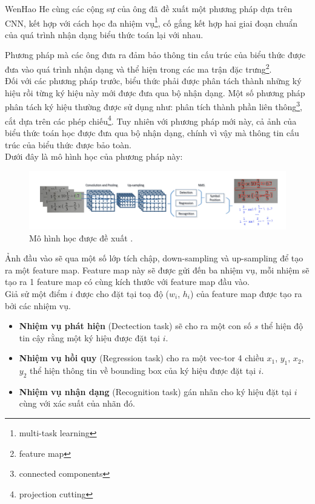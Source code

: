 \documentclass[a4paper,12pt]{article}
\begin{document}
	WenHao He cùng các cộng sự của ông đã đề xuất một phương pháp dựa trên CNN, kết hợp với cách học đa nhiệm vụ\footnote{multi-task learning}, cố gắng kết hợp hai giai đoạn chuẩn của quá trình nhận dạng biểu thức toán lại với nhau.
	
	Phương pháp mà các ông đưa ra đảm bảo thông tin cấu trúc của biểu thức được đưa vào quá trình nhận dạng và thể hiện trong các ma trận đặc trưng\footnote{feature map}\cite{yanlecun}. \\
	Đối với các phương pháp trước, biểu thức phải được phân tách thành những ký hiệu rồi từng ký hiệu này mới được đưa qua bộ nhận dạng. Một số phương pháp phân tách ký hiệu thường được sử dụng như: phân tích thành phần liên thông\footnote{connected components}, cắt dựa trên các phép chiếu\footnote{projection cutting}\cite{segment}. Tuy nhiên với phương pháp mới này, cả ảnh của biểu thức toán học được đưa qua bộ nhận dạng, chính vì vậy mà thông tin cấu trúc của biểu thức được bảo toàn. \\
	
	Dưới đây là mô hình học của phương pháp này:\\
	
	\begin{figure}[!h]
		\includegraphics[]{context_aware.png}
		\vspace{0.2cm}
		\caption{Mô hình học được đề xuất \cite{context}.}
		
	\end{figure}
	
	Ảnh đầu vào sẽ qua một số lớp tích chập, down-sampling và up-sampling để tạo ra một feature map. Feature map này sẽ được gửi đến ba nhiệm vụ, mỗi nhiệm sẽ tạo ra 1 feature map có cùng kích thước với feature map đầu vào. \\
	Giả sử một điểm $i$ được cho đặt tại toạ độ ($w_i$, $h_i$) của feature map được tạo ra bởi các nhiệm vụ. 
	\begin{itemize}
		\item \textbf{Nhiệm vụ phát hiện} (Dectection task) sẽ cho ra một con số $s$ thể hiện độ tin cậy rằng một ký hiệu được đặt tại $i$.
		\item \textbf{Nhiệm vụ hồi quy} (Regression task) cho ra một vec-tor 4 chiều {$x_1$, $y_1$, $x_2$, $y_2$} thể hiện thông tin về bounding box của ký hiệu được đặt tại $i$.
		\item\textbf{Nhiệm vụ nhận dạng} (Recognition task) gán nhãn cho ký hiệu đặt tại $i$ cùng với xác suất của nhãn đó. 
	\end{itemize}
	
\end{document}
